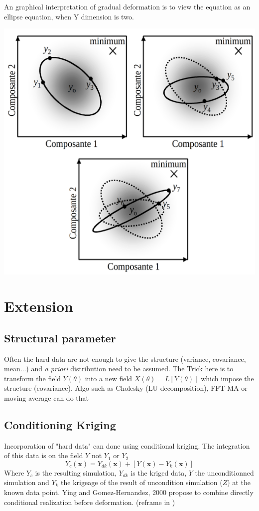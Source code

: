 \documentclass{article}
\newenvironment{Figure}
  {\par\medskip\noindent\minipage{\linewidth}}
  {\endminipage\par\medskip}
\begin{document}
\begin{multicols}{2}
An graphical interpretation of gradual deformation is to view the equation as an ellipse equation, when Y dimension is two.
\begin{Figure}
 \centering
 \includegraphics[width=\linewidth]{grad_def_ex_8.png}
\end{Figure}



\section{Extension}
\subsection{Structural parameter}
Often the hard data are not enough to give the structure (variance, covariance, mean...) and \textit{a priori} distribution need to be assumed. The Trick here is to transform the field $Y(\theta)$ into  a new field $X(\theta)=L[Y(\theta)]$ which impose the structure (covariance). Algo such as Cholesky (LU decomposition), FFT-MA or moving average can do that

\subsection{Conditioning Kriging}
Incorporation of "hard data" can done using conditional kriging. The integration of this data is on the field $Y$ not $Y_1$ or $Y_2$
\[Y_c (\mathbf{x}) = Y_{dk} (\mathbf{x}) + [Y(\mathbf{x}) − Y_k (\mathbf{x})] \]
Where $Y_c$ is the resulting simulation, $Y_{dk}$ is the kriged data, $Y$ the unconditionned simulation and $Y_k$ the krigeage of the result of uncondition simulation ($Z$) at the known data point.
Ying and Gomez-Hernandez, 2000 propose to combine directly conditional realization before deformation. (reframe in \cite{Hu2002})



\end{multicols}
\end{document}

